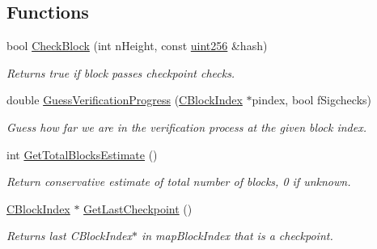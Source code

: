 \subsection*{Functions}
\begin{DoxyCompactItemize}
\item 
\mbox{\label{namespace_checkpoints_a4d9e42c5e5659730fc98113a94e2c84c}} 
bool \mbox{\hyperlink{namespace_checkpoints_a4d9e42c5e5659730fc98113a94e2c84c}{Check\+Block}} (int n\+Height, const \mbox{\hyperlink{classuint256}{uint256}} \&hash)
\begin{DoxyCompactList}\small\item\em Returns true if block passes checkpoint checks. \end{DoxyCompactList}\item 
\mbox{\label{namespace_checkpoints_ad473e253a3826fec1a7f9394c695ba91}} 
double \mbox{\hyperlink{namespace_checkpoints_ad473e253a3826fec1a7f9394c695ba91}{Guess\+Verification\+Progress}} (\mbox{\hyperlink{class_c_block_index}{C\+Block\+Index}} $\ast$pindex, bool f\+Sigchecks)
\begin{DoxyCompactList}\small\item\em Guess how far we are in the verification process at the given block index. \end{DoxyCompactList}\item 
\mbox{\label{namespace_checkpoints_ac4dc0a0ba00009be52fee3eef694c2c0}} 
int \mbox{\hyperlink{namespace_checkpoints_ac4dc0a0ba00009be52fee3eef694c2c0}{Get\+Total\+Blocks\+Estimate}} ()
\begin{DoxyCompactList}\small\item\em Return conservative estimate of total number of blocks, 0 if unknown. \end{DoxyCompactList}\item 
\mbox{\label{namespace_checkpoints_acd7c59bef29b80f040017d27b76e09a8}} 
\mbox{\hyperlink{class_c_block_index}{C\+Block\+Index}} $\ast$ \mbox{\hyperlink{namespace_checkpoints_acd7c59bef29b80f040017d27b76e09a8}{Get\+Last\+Checkpoint}} ()
\begin{DoxyCompactList}\small\item\em Returns last C\+Block\+Index$\ast$ in map\+Block\+Index that is a checkpoint. \end{DoxyCompactList}\end{DoxyCompactItemize}
